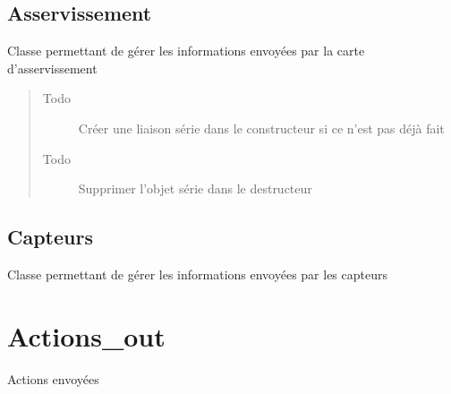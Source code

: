 \documentclass[letterpaper,10pt,french]{sphinxmanual}
\begin{document}
\subsection{Asservissement}
\label{actions:module-lib.actions_in.asservissement_in}\label{actions:asservissement}

\begin{fulllineitems}
\label{actions:lib.actions_in.asservissement_in.Asservissement_in}
Classe permettant de gérer les informations envoyées par la carte d'asservissement
\begin{quote}\begin{description}
\item[{Todo }] \leavevmode
Créer une liaison série dans le constructeur si ce n'est pas déjà fait

\item[{Todo }] \leavevmode
Supprimer l'objet série dans le destructeur

\end{description}\end{quote}

\end{fulllineitems}



\subsection{Capteurs}
\label{actions:capteurs}\label{actions:module-lib.actions_in.capteurs_in}

\begin{fulllineitems}
\label{actions:lib.actions_in.capteurs_in.Capteurs_in}
Classe permettant de gérer les informations envoyées par les capteurs

\end{fulllineitems}



\section{Actions\_out}
\label{actions:actions-out}
Actions envoyées
\end{document}
